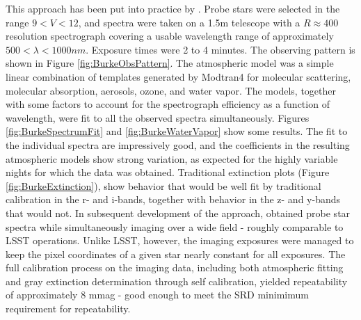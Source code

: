 \documentclass[12pt,preprint]{aastex}
\begin{document}
This approach has been put into practice by \cite{Burke2010b}.  Probe stars were selected in
the range $9 < V < 12$, and spectra were taken on a 1.5m telescope with a $R \approx 400$ resolution 
spectrograph covering a usable wavelength range of approximately $500 < \lambda <  1000 nm$.  Exposure times were 2 to 4 minutes.  The observing pattern is shown in Figure \ref{fig:BurkeObsPattern}.  
The atmospheric model was a simple linear combination of templates generated by Modtran4 for molecular scattering,
molecular absorption, aerosols, ozone, and water vapor.  The models, together with some factors to account for the
spectrograph efficiency as a function of wavelength, were fit to all the observed spectra simultaneously.   Figures 
\ref{fig:BurkeSpectrumFit} and \ref{fig:BurkeWaterVapor}
show some results.   The fit to the individual spectra are impressively good, and the coefficients in the resulting 
atmospheric models show strong variation, as expected for the highly variable nights for which the data was obtained.  
Traditional extinction plots (Figure \ref{fig:BurkeExtinction}), show behavior that would 
be well fit by traditional calibration in the r- 
and i-bands, together with behavior in the z- and y-bands that would not.  In subsequent development of the approach,
\cite{Burke2013} obtained probe star spectra while simultaneously imaging over a wide field - roughly 
comparable to LSST operations.  Unlike LSST, however, the imaging exposures were managed to keep the pixel coordinates
of a given star nearly constant for all exposures.  The full calibration process on the imaging data, 
including both atmospheric fitting and gray extinction determination through self calibration, yielded repeatability 
of approximately 8 mmag - good enough to meet the SRD minimimum requirement for repeatability.
\end{document}
